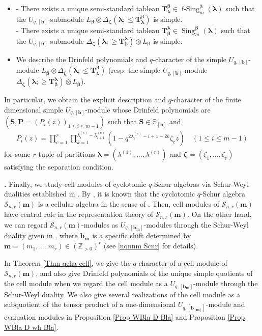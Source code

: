 \documentclass[12pt]{amsart}
\def \para{\refstepcounter{thm} \par\medskip\noindent
                \textbf{\thethm .} }
\numberwithin{equation}{thm}
\renewcommand\SS{\mathbb S} %
\newcommand\ZZ{\mathbb Z}
\newcommand\bP{\mathbf P}
\newcommand\bS{\mathbf S}
\newcommand\bT{\mathbf T}
\newcommand\bb{\mathbf b}
\renewcommand\bm{\mathbf m} %
\newcommand\sS{\mathscr S}
\newcommand\z{\zeta}
\newcommand\la{\lambda}
\newcommand\D{\Delta}
\newcommand\Bb{\boldsymbol\beta}
\newcommand\Bz{\boldsymbol\zeta}
\newcommand\Bla{\boldsymbol\lambda}
\newcommand{\Sing}{\operatorname{Sing}}
\newcommand{\fSing}{\operatorname{f-Sing}}
\newcounter{ni}
\begin{document}
\begin{itemize}
\item 
- There exists a unique semi-standard tableau $\bT_{\Bla}^{\Bb} \in \fSing_m^{\Bb} (\Bla)$ 
	such that the $U_{q,[\bb]}$-submodule $L_{\Bb} \otimes \D_{\Bz} (\Bla ; \leq \bT_{\Bla}^{\Bb})$ is simple. 
\\
- There exists a unique semi-standard tableau $\bT^{\Bla}_{\Bb} \in \Sing_m^{\Bb} (\Bla)$ 
	such that the $U_{q,[\bb]}$-submodule $\D_{\Bz} (\Bla ; \geq \bT^{\Bla}_{\Bb}) \otimes L_{\Bb}$ is simple.
\item 
We describe the Drinfeld polynomials and $q$-character of the simple $U_{q,[\bb]}$-module 
	$L_{\Bb} \otimes \D_{\Bz} (\Bla ; \leq \bT_{\Bla}^{\Bb})$ 
	(resp.  the simple $U_{q,[\bb]}$-module  $\D_{\Bz} (\Bla ; \geq \bT^{\Bla}_{\Bb}) \otimes L_{\Bb}$). 
\end{itemize}
In particular, we obtain the explicit description and $q$-character of the finite dimensional simple $U_{q,[\bb]}$-module 
whose Drinfeld polynomials are $(\bS, \bP =(P_i(z))_{1 \leq i \leq m-1})$ such that 
$\bS \in \SS_{[\bb]}$ and 
\begin{align*}
P_i(z) = \prod_{c=1}^r \prod_{k=1}^{\la_i^{(c)} - \la_{i+1}^{(c)}} (1 - q^{2 \la_i^{(c)} - i +1 - 2k} \z_{c} z) 
	\quad (1 \leq i \leq m-1) 
\end{align*}
for some $r$-tuple of partitions $\Bla=(\la^{(1)}, \dots, \la^{(r)})$ 
and $\Bz =(\z_1,\dots, \z_r)$ satisfying the separation condition. 


\para
Finally, 
we study cell modules of cyclotomic $q$-Schur algebras 
via Schur-Weyl dualities established in \cite{Wad24}. 
By \cite{DJM98}, 
it is known that the cyclotomic $q$-Schur algebra $\sS_{n,r}(\bm)$ is a cellular algebra in the sense of \cite{GL96}. 
Then, cell modules of $\sS_{n,r}(\bm)$ have central role in the representation theory of $\sS_{n,r}(\bm)$. 
On the other hand, we can regard $\sS_{n,r}(\bm)$-modules as $U_{q,[\bb_{\bm}]}$-modules 
through the Schur-Weyl duality given in \cite{Wad24}, 
where $\bb_{\bm}$ is a specific shift determined by $\bm=(m_1,\dots, m_r) \in (\ZZ_{>0})^r$ 
(see \ref{uqnnm Scnr} for details). 

In Theorem \ref{Thm qcha cell}, 
we give the $q$-character of  a cell module of $\sS_{n,r}(\bm)$, 
and also give Drinfeld polynomials of the unique simple quotients of the cell module 
when we regard the cell module as a $U_{q, [\bb_{\bm}]}$-module through the Schur-Weyl duality. 
We also give several realizations of the cell module as  a subquotient of the tensor product of a one-dimensional 
$U_{q,[\bb_{[\bm]}]}$-module and evaluation modules in Proposition \ref{Prop WBla D Bla} and Proposition \ref{Prop WBla D wh Bla}. 
\end{document}
